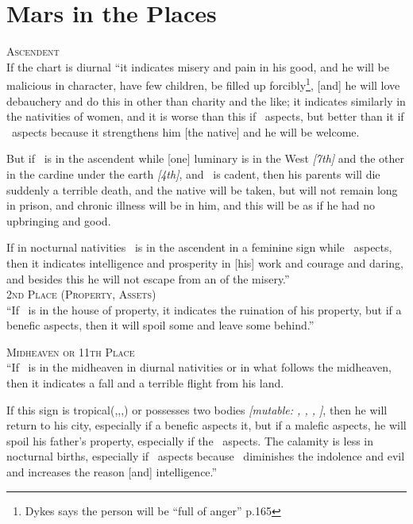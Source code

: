 \section{Mars in the Places}

\textsc{Ascendent} \hfill \\
\indent If the chart is diurnal ``it indicates misery and pain in his good, and he will be malicious in character, have few children, be filled up forcibly\footnote{Dykes says the person will be ``full of anger'' p.165}, [and] he will love debauchery and do this in other than charity and the like; it indicates similarly in the nativities of women, and it is worse than this if \Saturn\, aspects, but better than it if \Jupiter\, aspects because it strengthens him [the native] and he will be welcome.

But if \Mars\, is in the ascendent while [one] luminary is in the West \textsl{[7th]} and the other in the cardine under the earth \textsl{[4th]}, and \Jupiter\, is cadent, then his parents will die suddenly a terrible death, and the native will be taken, but will not remain long in prison, and chronic illness will be in him, and this will be as if he had no upbringing and good.

If in nocturnal nativities \Mars\, is in the ascendent in a feminine sign while \Jupiter\, aspects, then it indicates intelligence and prosperity in [his] work and courage and daring, and besides this he will not escape from an of the misery.'' \\

\noindent\textsc{2nd Place (Property, Assets)} \hfill \\
\indent ``If \Mars\, is in the house of property, it indicates the ruination of his property, but if a benefic aspects, then it will spoil some and leave some behind.''

\noindent\textsc{Midheaven or 11th Place} \hfill \\
``If \Mars\, is in the midheaven in diurnal nativities or in what follows the midheaven, then it indicates a fall and a terrible flight from his land. 

If this sign is tropical(\Aries,\Cancer,\Libra,\Capricorn) or possesses two bodies \textsl{[mutable: \Gemini, \Virgo, \Sagittarius, \Pisces]}, then he will return to his city, especially if a benefic aspects it, but if a malefic aspects, he will spoil his father's property, especially if the \Sun\, aspects. The calamity is less in nocturnal births, especially if \Jupiter\, aspects because \Jupiter\, diminishes the indolence and evil and increases the reason [and] intelligence.''

